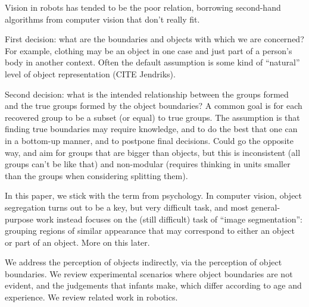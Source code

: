 
%
Vision in robots has tended to be the poor relation, borrowing
second-hand algorithms from computer vision that don't really
fit.
%



First decision: what are the boundaries and objects with which
we are concerned?  For example, clothing may be an object in
one case and just part of a person's body in another context.
Often the default assumption is some kind of ``natural''
level of object representation (CITE Jendriks).

Second decision: what is the intended relationship between the groups
formed and the true groups formed by the object boundaries?  A common
goal is for each recovered group to be a subset (or equal) to
true groups.  The assumption is that finding true boundaries may
require knowledge, and to do the best that one can in a bottom-up
manner, and to postpone final decisions.  Could go the opposite way,
and aim for groups that are bigger than objects, but this is 
inconsistent (all groups can't be like that) and non-modular 
(requires thinking in units smaller than the groups when considering 
splitting them).

In this paper, we
stick with the term from psychology.  In computer vision, object
segregation turns out to be a key, but very difficult task, and most
general-purpose work instead focuses on the (still difficult) task of
``image segmentation'': grouping regions of similar appearance that
may correspond to either an object or part of an object.
%
More on this later.
%


We address the perception of objects indirectly, via
the perception of object boundaries.  We review experimental scenarios
where object boundaries are not evident, and the judgements that
infants make, which differ according to age and experience.  We review
related work in robotics.  



